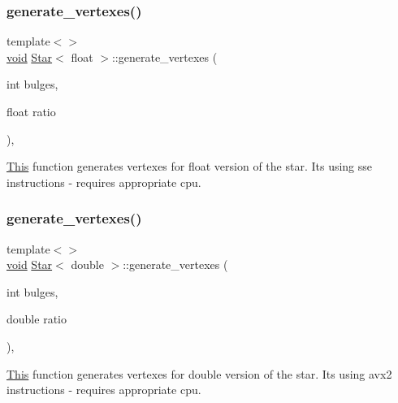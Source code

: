 \subsubsection{\texorpdfstring{generate\+\_\+vertexes()}{generate\_vertexes()}\hspace{0.1cm}{\footnotesize\ttfamily [2/3]}}
{\footnotesize\ttfamily template$<$$>$ \\
\mbox{\hyperlink{glad_8h_a950fc91edb4504f62f1c577bf4727c29}{void}} \mbox{\hyperlink{classStar}{Star}}$<$ float $>$\+::generate\+\_\+vertexes (\begin{DoxyParamCaption}\item[{int}]{bulges,  }\item[{float}]{ratio }\end{DoxyParamCaption})\hspace{0.3cm}{\ttfamily [inline]}, {\ttfamily [private]}}



\mbox{\hyperlink{classThis}{This}} function generates vertexes for float version of the star. It\textquotesingle{}s using sse instructions -\/ requires appropriate cpu. 

\mbox{\label{classStar_a85d8438cea72701a136b76f046ee95dd}} 
\subsubsection{\texorpdfstring{generate\+\_\+vertexes()}{generate\_vertexes()}\hspace{0.1cm}{\footnotesize\ttfamily [3/3]}}
{\footnotesize\ttfamily template$<$$>$ \\
\mbox{\hyperlink{glad_8h_a950fc91edb4504f62f1c577bf4727c29}{void}} \mbox{\hyperlink{classStar}{Star}}$<$ double $>$\+::generate\+\_\+vertexes (\begin{DoxyParamCaption}\item[{int}]{bulges,  }\item[{double}]{ratio }\end{DoxyParamCaption})\hspace{0.3cm}{\ttfamily [inline]}, {\ttfamily [private]}}



\mbox{\hyperlink{classThis}{This}} function generates vertexes for double version of the star. It\textquotesingle{}s using avx2 instructions -\/ requires appropriate cpu. 

